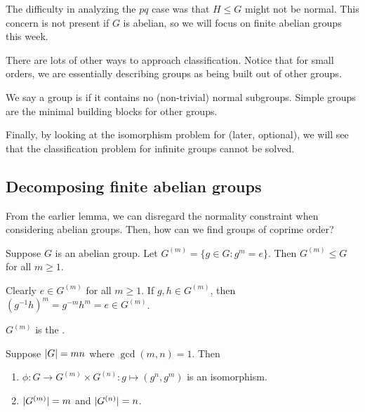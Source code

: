 \documentclass[12pt,letterpaper]{report}
\begin{document}
The difficulty in analyzing the $pq$ case was that $H \leq G$ might not be normal.
This concern is not present if $G$ is abelian, so we will focus on finite abelian groups this week.

There are lots of other ways to approach classification.
Notice that for small orders, we are essentially describing groups as being built out of other
groups.

We say a group is  if it contains no (non-trivial) normal subgroups.
Simple groups are the minimal building blocks for other groups.

Finally, by looking at the isomorphism problem for  (later,
optional), we will see that the classification problem for infinite groups cannot be solved.

\pagebreak
\subsection{Decomposing finite abelian groups}

From the earlier lemma, we can disregard the normality constraint when considering abelian groups.
Then, how can we find groups of coprime order?

\begin{lem}{}{}
  Suppose $G$ is an abelian group.
  Let $G^{(m)} = \{g \in G : g^m = e\}$.
  Then $G^{(m)} \leq G$ for all $m \geq 1$.
\end{lem}

\begin{thmproof}
  Clearly $e \in G^{(m)}$ for all $m \geq 1$.
  If $g, h \in G^{(m)}$, then $(g^{-1}h)^m = g^{-m}h^m = e \in G^{(m)}$.
\end{thmproof}

$G^{(m)}$ is the .

\begin{prop}{}{}
  Suppose $\lvert G\rvert = mn$ where $\gcd(m, n) = 1$.
  Then
  \begin{enumerate}
    \item $\phi \colon G \to G^{(m)} \times G^{(n)} : g \mapsto (g^n, g^m)$ is an isomorphism.
    \item $\lvert G^{(m)}\rvert = m$ and $\lvert G^{(n)}\rvert = n$.
  \end{enumerate}
\end{prop}
\end{document}
